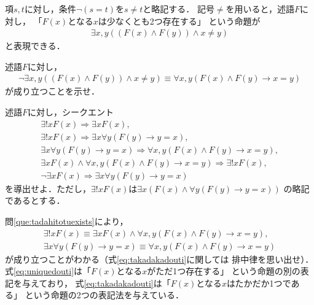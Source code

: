      項$s,  t$に対し，条件$\lnot(s=t)$を$s \neq t$と略記する．
     記号$\neq$を用いると，述語$F$に対し，
     「$F(x)$となる$x$は少なくとも2つ存在する」
     という命題が
     \begin{align}
       \exists x, y ((F(x) \land F(y) ) \land x \neq y)
       \label{eq:2tusonzai}
     \end{align}
     と表現できる．
     \begin{que} \label{que:2tusonzaihitei}
       述語$F$に対し，
       \begin{align*}
         \lnot \exists x,y ((F(x) \land F(y)) \land x \neq y)
         \equiv \forall x,y (F(x) \land F(y)  \to x=y)
       \end{align*}
       が成り立つことを示せ．
     \end{que}
     \begin{que} \label{que:tadahitotuexists}
       述語$F$に対し，シークエント
       \begin{align}
         \exists ! x F(x)
         \Longrightarrow \exists x F(x),
         \label{eq:existsunique} \\
         \exists ! x F(x)
         \Longrightarrow \exists x \forall y ( F(y) \to y=x ),
         \label{eq:existstenceunique} \\
         \exists x \forall y (F(y) \to y=x ) \Longrightarrow 
         \forall x, y (F(x) \land F(y) \to x=y),
         \label{eq:uniquetakadaka} \\
         \exists x F(x) \land \forall x,y (F(x) \land F(y) \to x=y) 
         \Longrightarrow \exists ! x F(x),
         \label{eq:takadakaunique} \\
         \lnot \exists x F(x) \Longrightarrow \exists x \forall y (F(y) \to y=x)
         \label{eq:lnottakadaka}
       \end{align}
       を導出せよ．ただし，$\exists ! x F(x)$は$\exists x (F(x) \land \forall y (F(y) \to y=x))$
       の略記であるとする．
     \end{que}

     問\ref{que:tadahitotuexists}により，
     \begin{align}
       \exists ! x F(x) \equiv \exists x F(x) \land \forall x, y (F(x)\land F(y) \to x=y),
       \label{eq:uniquedouti} \\
       \exists x \forall y (F(y) \to y=x) \equiv \forall x, y (F(x) \land F(y) \to x=y)
       \label{eq:takadakadouti}
     \end{align}
     が成り立つことがわかる（式\eqref{eq:takadakadouti}に関しては
     排中律を思い出せ）．
     式\eqref{eq:uniquedouti}は「$F(x)$となる$x$がただ1つ存在する」
     という命題の別の表記を与えており，
     式\eqref{eq:takadakadouti}は「$F(x)$となる$x$はたかだか1つである」
     という命題の2つの表記法を与えている．
